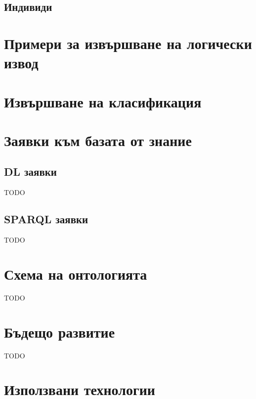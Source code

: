 \documentclass[12pt]{article}
\begin{document}
    
    \subsection{Индивиди}
    
    
    
    
    

\section{Примери за извършване на логически извод}








\section{Извършване на класификация}






\section{Заявки към базата от знание}

\subsection{DL заявки}

TODO

\subsection{SPARQL заявки}

TODO







\section{Схема на онтологията}

TODO



\section{Бъдещо развитие}

TODO




\section{Използвани технологии}
\end{document}
